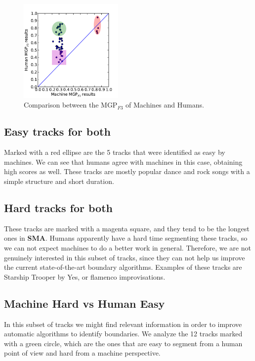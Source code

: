 \documentclass{article}
\begin{document}
\begin{figure}
  \centering
  \includegraphics[width=0.45\textwidth, height=0.28\textheight]{plots/machines-vs-humans.pdf}
  \caption{Comparison between the MGP$_{F3}$ of Machines and Humans.}
  \label{fig:machines-vs-humans}
\end{figure}%

\subsection{Easy tracks for both}

Marked with a red ellipse are the 5 tracks that were identified as easy by machines.
We can see that humans agree with machines in this case, obtaining high scores as well.
These tracks are mostly popular dance and rock songs with a simple structure and short duration.

\subsection{Hard tracks for both}

These tracks are marked with a magenta square, and they tend to be the longest ones in \textbf{SMA}.
Humans apparently have a hard time segmenting these tracks, so we can not expect machines to do a better work in general.
Therefore, we are not genuinely interested in this subset of tracks, since they can not help us improve the current state-of-the-art boundary algorithms.
Examples of these tracks are Starship Trooper by Yes, or flamenco improvisations.

\subsection{Machine Hard vs Human Easy}

In this subset of tracks we might find relevant information in order to improve automatic algorithms to identify boundaries.
We analyze the 12 tracks marked with a green circle, which are the ones that are easy to segment from a human point of view and hard from a machine perspective.
\end{document}
